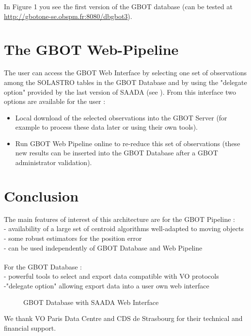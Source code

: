 In Figure 1 you see the  first version of the GBOT database (can be tested at \url{http://gbotone-se.obspm.fr:8080/dbgbot3}).

\section{The GBOT Web-Pipeline}
The user can access the GBOT Web Interface by selecting one set of observations among the SOLASTRO tables in the GBOT Database and by using the "delegate option" provided by the last version of SAADA (see \citet{michel12}). From this interface two options are available for the user :
\begin{itemize}
\item Local download of the selected observations into the GBOT Server
(for example to process these data later or using their own tools).
\item Run GBOT Web Pipeline online to re-reduce this set of observations
(these new results can be inserted into the GBOT Database after a GBOT administrator validation).
\end{itemize}

\section{Conclusion}
The main features of interest of this architecture  are for the GBOT Pipeline :\\
\hspace*{0.25cm}- availability of a large set of centroid algorithms well-adapted to moving objects\\
\hspace*{0.25cm}- some robust estimators for the position error \\
\hspace*{0.25cm}- can be used independently of GBOT Database and Web Pipeline\\\\
For the GBOT Database : \\
\hspace*{0.25cm}- powerful tools to select and export data compatible with VO protocols \\
\hspace*{0.25cm}-"delegate option" allowing export data into a user own web interface

\begin{figure}[ht]
\caption{GBOT Database with SAADA Web Interface} \label{P03-fig-1}
\end{figure}



\acknowledgements 
We thank VO Paris Data Centre and CDS de Strasbourg for their technical and financial support.



